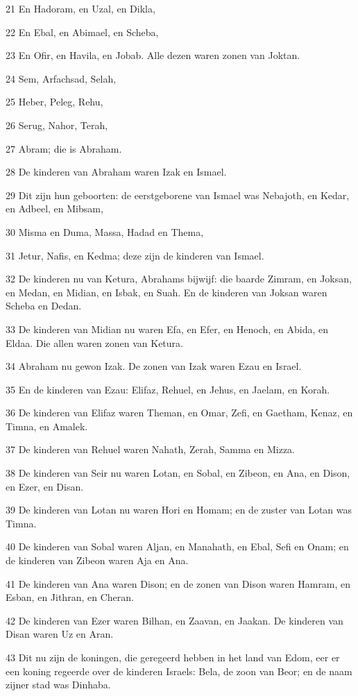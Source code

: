 \par 21 En Hadoram, en Uzal, en Dikla,
\par 22 En Ebal, en Abimael, en Scheba,
\par 23 En Ofir, en Havila, en Jobab. Alle dezen waren zonen van Joktan.
\par 24 Sem, Arfachsad, Selah,
\par 25 Heber, Peleg, Rehu,
\par 26 Serug, Nahor, Terah,
\par 27 Abram; die is Abraham.
\par 28 De kinderen van Abraham waren Izak en Ismael.
\par 29 Dit zijn hun geboorten: de eerstgeborene van Ismael was Nebajoth, en Kedar, en Adbeel, en Mibsam,
\par 30 Misma en Duma, Massa, Hadad en Thema,
\par 31 Jetur, Nafis, en Kedma; deze zijn de kinderen van Ismael.
\par 32 De kinderen nu van Ketura, Abrahams bijwijf: die baarde Zimram, en Joksan, en Medan, en Midian, en Isbak, en Suah. En de kinderen van Joksan waren Scheba en Dedan.
\par 33 De kinderen van Midian nu waren Efa, en Efer, en Henoch, en Abida, en Eldaa. Die allen waren zonen van Ketura.
\par 34 Abraham nu gewon Izak. De zonen van Izak waren Ezau en Israel.
\par 35 En de kinderen van Ezau: Elifaz, Rehuel, en Jehus, en Jaelam, en Korah.
\par 36 De kinderen van Elifaz waren Theman, en Omar, Zefi, en Gaetham, Kenaz, en Timna, en Amalek.
\par 37 De kinderen van Rehuel waren Nahath, Zerah, Samma en Mizza.
\par 38 De kinderen van Seir nu waren Lotan, en Sobal, en Zibeon, en Ana, en Dison, en Ezer, en Disan.
\par 39 De kinderen van Lotan nu waren Hori en Homam; en de zuster van Lotan was Timna.
\par 40 De kinderen van Sobal waren Aljan, en Manahath, en Ebal, Sefi en Onam; en de kinderen van Zibeon waren Aja en Ana.
\par 41 De kinderen van Ana waren Dison; en de zonen van Dison waren Hamram, en Esban, en Jithran, en Cheran.
\par 42 De kinderen van Ezer waren Bilhan, en Zaavan, en Jaakan. De kinderen van Disan waren Uz en Aran.
\par 43 Dit nu zijn de koningen, die geregeerd hebben in het land van Edom, eer er een koning regeerde over de kinderen Israels: Bela, de zoon van Beor; en de naam zijner stad was Dinhaba.
